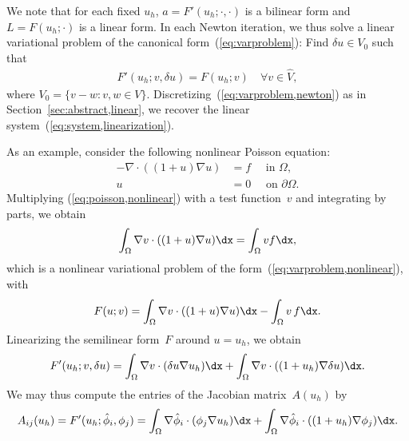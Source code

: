 We note that for each fixed $u_h$, $a = F'(u_h; \cdot, \cdot)$ is
a bilinear form and $L = F(u_h; \cdot)$ is a linear form. In each
Newton iteration, we thus solve a linear variational problem of the
canonical form~(\ref{eq:varproblem}): Find $\delta u \in V_0$ such
that
\begin{equation} \label{eq:varproblem,newton}
  \begin{split}
    F'(u_h; v, \delta u) = F(u_h; v) \quad \forall v \in \hat{V},
  \end{split}
\end{equation}
where $V_0 = \{v - w: v, w \in
V\}$. Discretizing~(\ref{eq:varproblem,newton}) as in
Section~\ref{sec:abstract,linear}, we recover the linear
system~(\ref{eq:system,linearization}).

\begin{example}

As an example, consider the following nonlinear Poisson equation:
\begin{equation} \label{eq:poisson,nonlinear}
  \begin{split}
    - \nabla \cdot ((1+u) \nabla u) &= f \quad \mbox{ in } \Omega, \\
    u &= 0 \quad \mbox{ on } \partial\Omega.
  \end{split}
\end{equation}
Multiplying (\ref{eq:poisson,nonlinear}) with a test function~$v$ and
integrating by parts, we obtain
\begin{displaymath}
  \int_{\Omega} \nabla v \cdot ((1+u) \nabla u) \dx =
  \int_{\Omega} v f \dx,
\end{displaymath}
which is a nonlinear variational problem of the
form~(\ref{eq:varproblem,nonlinear}), with
\begin{displaymath}
  F(u; v) = \int_{\Omega} \nabla v \cdot ((1+u) \nabla u) \dx
  - \int_{\Omega} v \, f \dx.
\end{displaymath}
Linearizing the semilinear form~$F$ around $u = u_h$, we obtain
\begin{displaymath}
  F'(u_h; v, \delta u) =
  \int_{\Omega} \nabla v \cdot (\delta u \nabla u_h) \dx +
  \int_{\Omega} \nabla v \cdot ((1 + u_h) \nabla \delta u) \dx.
\end{displaymath}
We may thus compute the entries of the Jacobian matrix~$A(u_h)$ by
\begin{equation}
  A_{ij}(u_h) = F'(u_h; \hat{\phi}_i, \phi_j) =
  \int_{\Omega} \nabla \hat{\phi}_i \cdot (\phi_j \nabla u_h) \dx +
  \int_{\Omega} \nabla \hat{\phi}_i \cdot ((1 + u_h) \nabla \phi_j) \dx.
\end{equation}

\end{example}

